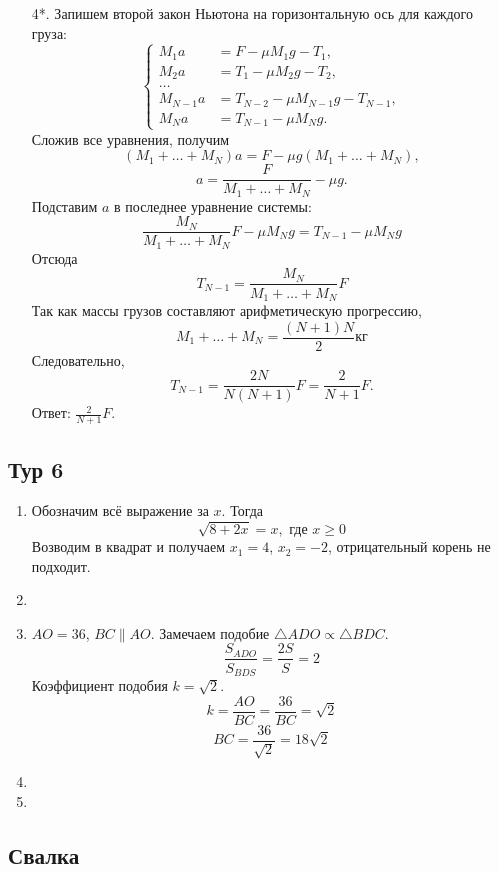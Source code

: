 \documentclass[12pt]{article} %
\begin{document}
\begin{enumerate}
\item[4*.]
    Запишем второй закон Ньютона на горизонтальную ось для каждого груза:
    \[
        \begin{cases}
            M_1 a &= F   - \mu M_1 g - T_1, \\
            M_2 a &= T_1 - \mu M_2 g - T_2,\\
            \ldots \\ %
            M_{N-1} a &= T_{N-2} - \mu M_{N-1} g - T_{N-1},\\
            M_{N}   a &= T_{N-1} - \mu M_{N} g.
        \end{cases}
    \]
    Сложив все уравнения, получим
    \[
        (M_1 + \ldots + M_N) a = F - \mu g (M_1 + \ldots + M_N),
    \]
    \[
        a = \frac{F}{M_1 + \ldots + M_N} - \mu g.
    \]
    Подставим $a$ в последнее уравнение системы:
    \[
        \frac{M_N}{M_1 + \ldots + M_N}F - \mu M_N g = T_{N-1} - \mu M_N g
    \]
    Отсюда 
    \[
        T_{N-1} = \frac{M_N}{M_1 + \ldots + M_N}F
    \]
    Так как массы грузов составляют арифметическую прогрессию,
    \[
        M_1 + \ldots + M_N = \frac{(N+1)N}{2} \text{кг}
    \]
    Следовательно,
    \[
        T_{N-1} = \frac{2N}{N(N+1)} F = \frac{2}{N+1} F.
    \]
    Ответ: $\frac{2}{N+1} F$.
    
\end{enumerate}

\subsection*{Тур 6}

\begin{enumerate}
\item Обозначим всё выражение за $x$. Тогда
\[
\sqrt{8 + 2x} = x, \text{ где } x\geq 0     
\]
Возводим в квадрат и получаем $x_1 = 4$, $x_2 = -2$, отрицательный корень не подходит. 
\item 
\item $AO=36$, $BC\parallel AO$. Замечаем подобие $\triangle ADO \propto \triangle BDC$. 
\[
\frac{S_{ADO}}{S_{BDS}} = \frac{2S}{S} = 2    
\]
Коэффициент подобия $k = \sqrt{2}$. 
\[
k = \frac{AO}{BC} = \frac{36}{BC} = \sqrt{2}    
\]
\[
BC = \frac{36}{\sqrt{2}} = 18 \sqrt{2}    
\]
\item 
\item 
\end{enumerate}

\subsection*{Свалка}
\end{document}
